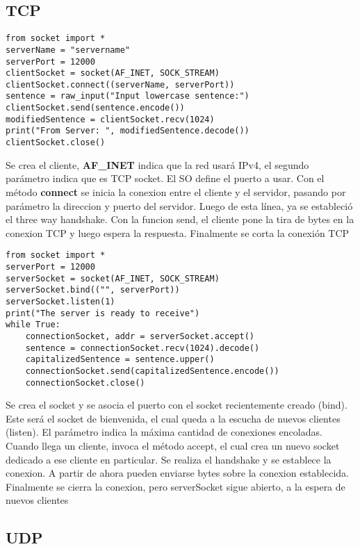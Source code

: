 
\subsection{TCP}

\begin{lstlisting}[caption= Cliente TCP]
from socket import *
serverName = "servername"
serverPort = 12000
clientSocket = socket(AF_INET, SOCK_STREAM)
clientSocket.connect((serverName, serverPort))
sentence = raw_input("Input lowercase sentence:")
clientSocket.send(sentence.encode())
modifiedSentence = clientSocket.recv(1024)
print("From Server: ", modifiedSentence.decode())
clientSocket.close()

\end{lstlisting}

Se crea el cliente, \textbf{AF\_INET} indica que la red usará IPv4, el segundo parámetro indica que es TCP socket. El SO define el puerto a usar. Con el método \textbf{connect} se inicia la conexion entre el cliente y el servidor, pasando por parámetro la direccion y puerto del servidor. Luego de esta línea, ya se estableció el three way handshake. Con la funcion send, el cliente pone la tira de bytes en la conexion TCP y luego espera la respuesta. Finalmente se corta la conexión TCP


\begin{lstlisting}[caption= Servidor TCP]
from socket import *
serverPort = 12000
serverSocket = socket(AF_INET, SOCK_STREAM)
serverSocket.bind(("", serverPort))
serverSocket.listen(1)
print("The server is ready to receive")
while True:
    connectionSocket, addr = serverSocket.accept()
    sentence = connectionSocket.recv(1024).decode()
    capitalizedSentence = sentence.upper()
    connectionSocket.send(capitalizedSentence.encode())
    connectionSocket.close()
\end{lstlisting}

Se crea el socket y se asocia el puerto con el socket recientemente creado (bind). Este será el socket de bienvenida, el cual queda a la escucha de nuevos clientes (listen). El parámetro indica la máxima cantidad de conexiones encoladas. Cuando llega un cliente, invoca el método accept, el cual crea un nuevo socket dedicado a ese cliente en particular. Se realiza el handshake y se establece la conexion. A partir de ahora pueden enviarse bytes sobre la conexion establecida. Finalmente se cierra la conexion, pero serverSocket sigue abierto, a la espera de nuevos clientes

\subsection{UDP}

